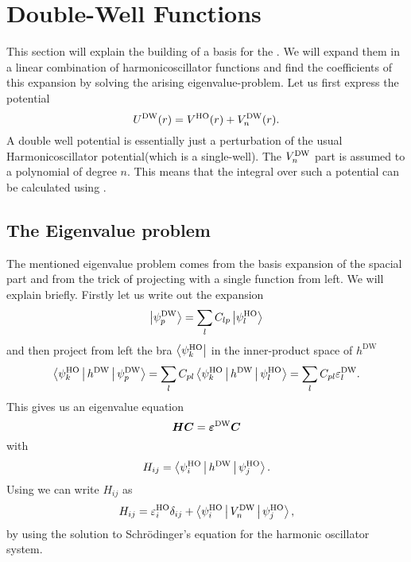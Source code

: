\section{Double-Well Functions\label{sec:dwfunc}}
    This section will explain the building of a basis for the
    . We will expand them in a linear combination
    of harmonicoscillator functions and find the coefficients of this expansion
    by solving the arising eigenvalue-problem. Let us first express the
    potential
        \begin{equation}
            U^{\text{DW}}(r) = V^{\text{HO}}(r) + V^{\text{DW}}_n(r).
            \label{eq:UDW}
        \end{equation}
    A double well potential is essentially just a perturbation of the usual
    Harmonicoscillator potential(which is a single-well). The $V^{\text{DW}}_n$ part is
    assumed to a polynomial of degree $n$. This means that the integral over
    such a potential can be calculated using .

\subsection{The Eigenvalue problem}
    The mentioned eigenvalue problem comes from the basis expansion of the
    spacial part and from the trick of projecting with a single function from
    left. We will explain briefly. Firstly let us write out the expansion
        \begin{equation}
            \ket{\psi^{\text{DW}}_p} = \sum\limits_{l}C_{lp}\ket{\psi^{\text{HO}}_l}
            \label{eq:dwexpansiondef}
        \end{equation}
    and then project from left the bra $\bra{\psi^{\text{HO}}_k}$ in the
    inner-product space of $h^{\text{DW}}$
        \begin{equation}
            \Braket{\psi^{\text{HO}}_k|h^{\text{DW}}|\psi^{\text{DW}}_p} =
            \sum\limits_{l}C_{pl}\Braket{\psi^{\text{HO}}_k|h^{\text{DW}}|\psi^{\text{HO}}_l} =
            \sum\limits_{l}C_{pl}\varepsilon^{\text{DW}}_l.
        \end{equation}
    This gives us an eigenvalue equation
        \begin{equation}
            \boldsymbol{{H}}\boldsymbol{{C}} = \boldsymbol{{\varepsilon^{\text{DW}}}}\boldsymbol{{C}}
        \end{equation}
    with
        \begin{equation}
            H_{ij} = \Braket{\psi^{\text{HO}}_i|h^{\text{DW}}|\psi^{\text{HO}}_j}.
        \end{equation}
    Using  we can write $H_{ij}$ as
        \begin{equation}
            H_{ij} = \varepsilon^{\text{HO}}_i\delta_{ij} +
            \Braket{\psi^{\text{HO}}_i|V^{\text{DW}}_n|\psi^{\text{HO}}_j},
            \label{eq:Heigdef}
        \end{equation}
    by using the solution to Schrödinger's equation for the harmonic oscillator
    system.

